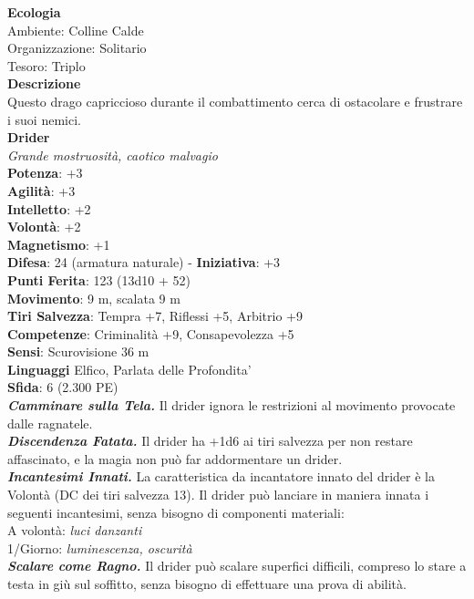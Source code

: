 \begin{multicols}{2}
\textbf{Ecologia}\\
Ambiente: Colline Calde\\
Organizzazione: Solitario\\
Tesoro: Triplo\\
\textbf{Descrizione}\\
Questo drago capriccioso durante il combattimento cerca di ostacolare e frustrare i suoi nemici.\\


\medskip\textbf{Drider}\\
\emph{Grande mostruosità, caotico malvagio}\\
\textbf{Potenza}: +3\\
\textbf{Agilità}: +3\\
\textbf{Intelletto}: +2\\
\textbf{Volontà}: +2\\
\textbf{Magnetismo}: +1\\
\textbf{Difesa}: 24 (armatura naturale) - \textbf{Iniziativa}: +3\\
\textbf{Punti Ferita}: 123 (13d10 + 52)\\
\textbf{Movimento}: 9 m, scalata 9 m\\
\textbf{Tiri Salvezza}: Tempra +7, Riflessi +5, Arbitrio +9\\
\textbf{Competenze}: Criminalità +9, Consapevolezza +5\\
\textbf{Sensi}: Scurovisione 36 m\\
\textbf{Linguaggi} Elfico, Parlata delle Profondita'\\
\textbf{Sfida}: 6 (2.300 PE)\smallskip\\
\emph{\textbf{Camminare sulla Tela.}} Il drider ignora le restrizioni al movimento provocate dalle ragnatele.\\
\emph{\textbf{Discendenza Fatata.}} Il drider ha +1d6 ai tiri salvezza per non restare affascinato, e la magia non può far addormentare un drider.\\
\emph{\textbf{Incantesimi Innati.}} La caratteristica da incantatore innato del drider è la Volontà (DC dei tiri salvezza 13). Il drider può lanciare in maniera innata i seguenti incantesimi, senza bisogno  di componenti materiali:\\
A volontà: \emph{luci danzanti}\\
1/Giorno: \emph{luminescenza, oscurità}\\
\emph{\textbf{Scalare come Ragno.}} Il drider può scalare superfici difficili, compreso lo stare a testa in giù sul soffitto, senza bisogno di effettuare una prova di abilità.\\

\end{multicols}
